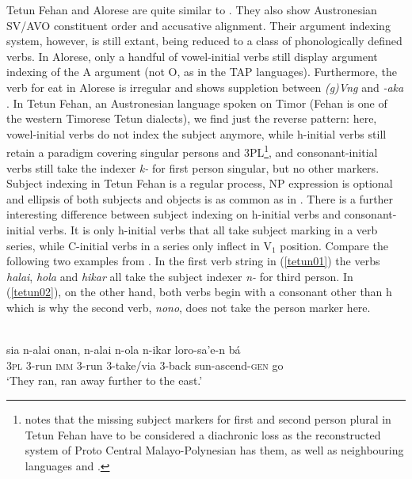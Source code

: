 Tetun Fehan and Alorese are quite similar to . They also show Austronesian SV/AVO constituent order and accusative alignment. Their argument indexing system, however, is still extant, being reduced to a class of phonologically defined verbs. In Alorese, only a handful of vowel-initial verbs still display argument indexing of the A argument (not O, as in the TAP languages). Furthermore, the verb for eat in Alorese is irregular and shows suppletion between \textit{(g)Vng} and \textit{-aka} \citep[61]{klamer2011alorese}. In Tetun Fehan, an Austronesian language spoken on Timor (Fehan is one of the western Timorese Tetun dialects), we find just the reverse pattern: here, vowel-initial verbs do not index the subject anymore, while h-initial verbs still retain a paradigm covering singular persons and 3PL\footnote{\citet[173 footnote 5]{vanklinken1999grammar} notes that the missing subject markers for first and second person plural in Tetun Fehan have to be considered a diachronic loss as the reconstructed system of Proto Central Malayo-Polynesian has them, as well as neighbouring languages  and .}, and consonant-initial verbs still take the indexer \textit{k-} for first person singular, but no other markers. Subject indexing in Tetun Fehan is a regular process, NP expression is optional and ellipsis of both subjects and objects is as common as in . There is a further interesting difference between subject indexing on h-initial verbs and consonant-initial verbs. It is only h-initial verbs that all take subject marking in a verb series, while C-initial verbs in a series only inflect in V$_1$ position. Compare the following two examples from \citet{vanklinken1999grammar}. In the first verb string in (\ref{tetun01}) the verbs \textit{halai}, \textit{hola} and \textit{hikar} all take the subject indexer \textit{n-} for third person. In (\ref{tetun02}), on the other hand, both verbs begin with a consonant other than h which is why the second verb, \textit{nono}, does not take the person marker here.

\ea \label{tetun01}
\\
\gll sia n-alai onan, n-alai n-ola n-ikar loro-sa'e-n bá \\
\textsc{3}\textsc{pl} \textsc{3}-run \textsc{imm} \textsc{3}-run \textsc{3}-take/via \textsc{3}-back sun-ascend-\textsc{gen} go \\
\glft `They ran, ran away further to the east.'
\z

